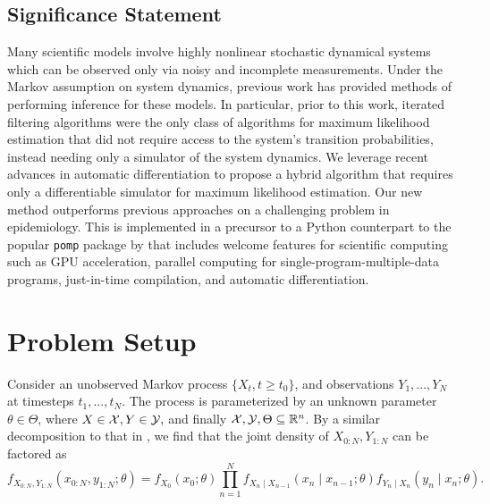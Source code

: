 \documentclass{article}
\begin{document}

\subsection{Significance Statement}
Many scientific models involve highly nonlinear stochastic dynamical systems which can be observed only via noisy and incomplete measurements. Under the Markov assumption on system dynamics, previous work has provided methods of performing inference for these models. In particular, prior to this work, iterated filtering algorithms were the only class of algorithms for maximum likelihood estimation that did not require access to the system's transition probabilities, instead needing only a simulator of the system dynamics. We leverage recent advances in automatic differentiation to propose a hybrid algorithm that requires only a differentiable simulator for maximum likelihood estimation. Our new method outperforms previous approaches on a challenging problem in epidemiology. This is implemented in a precursor to a Python counterpart to the popular \texttt{pomp} package by \citet{king2016pomp, king2017pompmanual} that includes welcome features for scientific computing such as GPU acceleration, parallel computing for single-program-multiple-data programs, just-in-time compilation, and automatic differentiation.


\section{Problem Setup}

Consider an unobserved Markov process $\{X_t, t \geq t_0\}$, and observations $Y_1,...,Y_N$ at timesteps $t_1,..., t_N$. The process is parameterized by an unknown parameter $\theta \in \Theta$, where $X \in {\mathcal{X}}, Y \in {\mathcal{Y}},$ and finally ${\mathcal{X}}, {\mathcal{Y}}, \Theta \subseteq \mathbb{R}^n$. By a similar decomposition to that in \citet{doucet2009tutorial}, we find that the joint density of $X_{0:N}, Y_{1:N}$ can be factored as
$$f_{X_{0: N}, Y_{1: N}}\left(x_{0: N}, y_{1: N} ; \theta\right)=f_{X_0}\left(x_0 ; \theta\right) \prod_{n=1}^N f_{X_n \mid X_{n-1}}\left(x_n \mid x_{n-1} ; \theta\right) f_{Y_n \mid X_n}\left(y_n \mid x_n ; \theta\right).$$
\end{document}
